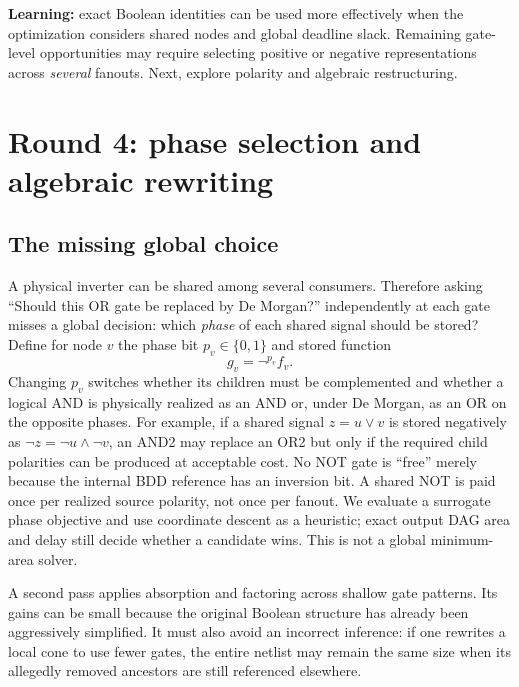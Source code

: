\documentclass[a4paper,10pt]{article}
\theoremstyle{definition}
\theoremstyle{remark}
\begin{document}
\begin{tcolorbox}[colback=ResearchBlue!20,colframe=ResearchBlue,title=Decision after Round 3]
\textbf{Learning:} exact Boolean identities can be used more effectively when the optimization considers shared nodes and global deadline slack. Remaining gate-level opportunities may require selecting positive or negative representations across \emph{several} fanouts. Next, explore polarity and algebraic restructuring.
\end{tcolorbox}

\section{Round 4: phase selection and algebraic rewriting}
\subsection{The missing global choice}
A physical inverter can be shared among several consumers. Therefore asking ``Should this OR gate be replaced by De Morgan?'' independently at each gate misses a global decision: which \emph{phase} of each shared signal should be stored? Define for node $v$ the phase bit $p_v\in\{0,1\}$ and stored function
\begin{equation}
 g_v=\neg^{p_v}f_v.
\end{equation}
Changing $p_v$ switches whether its children must be complemented and whether a logical AND is physically realized as an AND or, under De Morgan, as an OR on the opposite phases. For example, if a shared signal $z=u\lor v$ is stored negatively as $\neg z=\neg u\land\neg v$, an AND2 may replace an OR2 but only if the required child polarities can be produced at acceptable cost. No NOT gate is ``free'' merely because the internal BDD reference has an inversion bit. A shared NOT is paid once per realized source polarity, not once per fanout. We evaluate a surrogate phase objective and use coordinate descent as a heuristic; exact output DAG area and delay still decide whether a candidate wins. This is not a global minimum-area solver.

A second pass applies absorption and factoring across shallow gate patterns. Its gains can be small because the original Boolean structure has already been aggressively simplified. It must also avoid an incorrect inference: if one rewrites a local cone to use fewer gates, the entire netlist may remain the same size when its allegedly removed ancestors are still referenced elsewhere.
\end{document}
